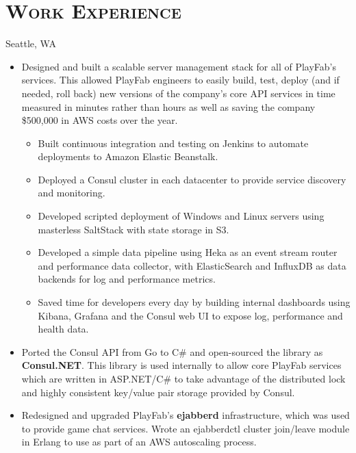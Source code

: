 \documentclass[11pt,letter,roman]{moderncv}
\begin{document}
\section{\textsc{Work Experience}}
{Seattle, WA}{}{%
  \begin{itemize}
    \item Designed and built a scalable server management stack for all of
      PlayFab's services. This allowed PlayFab engineers to easily build, test,
      deploy (and if needed, roll back) new versions of the company's core API
      services in time measured in minutes rather than hours as well as saving
      the company \$500,000 in AWS costs over the year.
      \begin{itemize}
        \item Built continuous integration and testing on Jenkins to automate
          deployments to Amazon Elastic Beanstalk.
        \item Deployed a Consul cluster in each datacenter to provide service
          discovery and monitoring.
        \item Developed scripted deployment of Windows and Linux servers using
          masterless SaltStack with state storage in S3.
        \item Developed a simple data pipeline using Heka as an event stream
          router and performance data collector, with ElasticSearch and
          InfluxDB as data backends for log and performance metrics.
        \item Saved time for developers every day by building internal
          dashboards using Kibana, Grafana and the Consul web UI to expose log,
          performance and health data.
      \end{itemize}
    \item Ported the Consul API from Go to C\# and open-sourced the library as
      \textbf{Consul.NET}. This library is used internally to allow core
      PlayFab services which are written in ASP.NET/C\# to take advantage of
      the distributed lock and highly consistent key/value pair storage
      provided by Consul.
    \item Redesigned and upgraded PlayFab's \textbf{ejabberd} infrastructure,
      which was used to provide game chat services. Wrote an ejabberdctl
      cluster join/leave module in Erlang to use as part of an AWS autoscaling
      process.
  \end{itemize}
}
\end{document}
